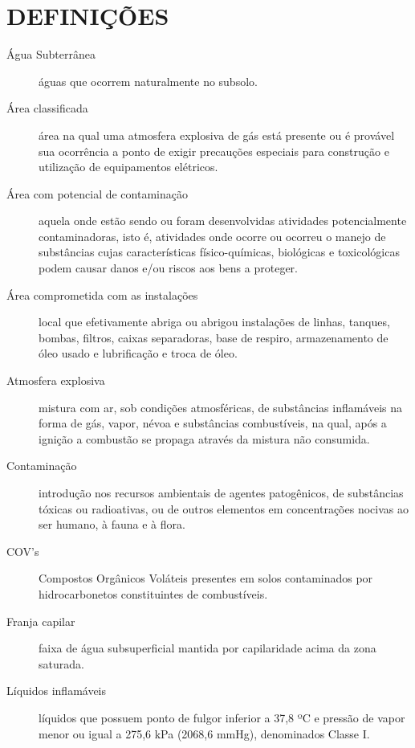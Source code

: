\chapter{DEFINIÇÕES}

\begin{description}
	\item[Água Subterrânea] águas que ocorrem naturalmente 
	no subsolo.
	
	\item[Área classificada] área na qual uma atmosfera 
	explosiva de gás está presente ou é provável sua 
	ocorrência a ponto de exigir precauções especiais para 
	construção e utilização de equipamentos elétricos.
	
	\item[Área com potencial de contaminação] aquela onde 
	estão sendo ou foram desenvolvidas atividades 
	potencialmente contaminadoras, isto é, atividades onde 
	ocorre ou ocorreu o manejo de substâncias cujas 
	características físico-químicas, biológicas e 
	toxicológicas podem causar danos e/ou riscos aos bens a 
	proteger.
	
	\item[Área comprometida com as instalações] local que 
	efetivamente abriga ou abrigou instalações de linhas, 
	tanques, bombas, filtros, caixas separadoras, base de 
	respiro, armazenamento de óleo usado e lubrificação e 
	troca de óleo.
	
	\item[Atmosfera explosiva] mistura com ar, sob 
	condições atmosféricas, de substâncias inflamáveis na 
	forma de gás, vapor, névoa e substâncias combustíveis, 
	na qual, após a ignição a combustão se propaga através 
	da mistura não consumida.
	
	\item[Contaminação] introdução nos recursos ambientais 
	de agentes patogênicos, de substâncias tóxicas ou 
	radioativas, ou de outros elementos em concentrações 
	nocivas ao ser humano, à fauna e à flora.
	
	\item[COV’s] Compostos Orgânicos Voláteis presentes em 
	solos contaminados por hidrocarbonetos constituintes de 
	combustíveis.
	
	\item[Franja capilar] faixa de água subsuperficial 
	mantida por capilaridade acima da zona saturada.
	
	\item[Líquidos inflamáveis] líquidos que possuem ponto 
	de fulgor inferior a 37,8 ºC e pressão de vapor menor 
	ou igual a 275,6 kPa (2068,6 mmHg), denominados Classe 
	I.
	

\end{description}
